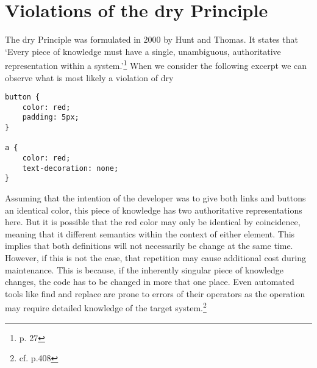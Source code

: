 \section{Violations of the \acrlong{dry} Principle}
The \gls{dry} Principle was formulated in 2000 by Hunt and Thomas.
It states that 
`Every piece of knowledge must have a single, unambiguous, authoritative representation within a system.'\footnote{\cite{pragmaticprogrammer} p. 27}
When we consider the following excerpt we can observe what is most likely a violation of \gls{dry}

\begin{verbatim}
button {
    color: red;
    padding: 5px;
}

a {
    color: red;
    text-decoration: none;
}
\end{verbatim}

Assuming that the intention of the developer was to give both links and buttons an identical color, this piece of knowledge has two authoritative representations here.
But it is possible that the red color may only be identical by coincidence, meaning that it different semantics within the context of either element.
This implies that both definitions will not necessarily be change at the same time.
However, if this is not the case, that repetition may cause additional cost during maintenance.
This is because, if the inherently singular piece of knowledge changes, the code has to be changed in more that one place.
Even automated tools like find and replace are prone to errors of their operators as the operation may require detailed knowledge of the target system.\footnote{cf. \cite{humanautomation} p.408}
